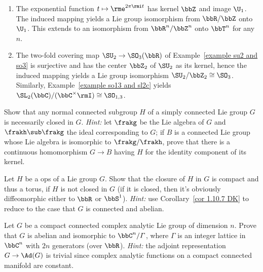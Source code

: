 \begin{example}
    \begin{enumerate}
        \item The exponential function $t\mapsto \rme^{2\pi\rmi t}$ has kernel $\bbZ$ and image $\U_1$. The induced mapping yields a Lie group isomorphism from $\bbR\slash \bbZ$ onto $\U_1$. This extends to an isomorphism from $\bbR^n\slash\bbZ^n$ onto $\bbT^n$ for any $n$.
        \item The two-fold covering map $\SU_2\to \SO_3(\bbR)$ of Example~\ref{example su2 and so3} is surjective and has the center $\bbZ_2$ of $\SU_2$ as its kernel, hence the induced mapping yields a Lie group isomorphism $\SU_2\slash\bbZ_2\cong \SO_3$. Similarly, Example~\ref{example so13 and sl2c} yields $\SL_2(\bbC)\slash (\bbC^\times \rmI)\cong \SO_{1,3}$.
    \end{enumerate}
\end{example}



\begin{xca}
    Show that any normal connected subgroup $H$ of a simply connected Lie group $G$ is necessarily closed in $G$. \emph{Hint:} let $\frakg$ be the Lie algebra of $G$ and $\frakh\sub\frakg$ the ideal corresponding to $G$; if $B$ is a connected Lie group whose Lie algebra is isomorphic to $\frakg\slash\frakh$, prove that there is a continuous homomorphism $G\to B$ having $H$ for the identity component of its kernel.
\end{xca}

\begin{xca}
    Let $H$ be a \gls{ops} of a Lie group $G$. Show that the closure of $H$ in $G$ is compact and thus a torus, if $H$ is not closed in $G$ (if it is closed, then it's obviously diffeomorphic either to $\bbR$ or $\bbS^1$). \emph{Hint:} use Corollary~\ref{cor 1.10.7 DK} to reduce to the case that $G$ is connected and abelian.
\end{xca}

\begin{xca}
    Let $G$ be a compact connected complex analytic Lie group of dimension $n$. Prove that $G$ is abelian and isomorphic to $\bbC^n\slash\varGamma$, where $\varGamma$ is an integer lattice in $\bbC^n$ with $2n$ generators (over $\bbR$). \emph{Hint:} the adjoint representation $G\to \Ad(G)$ is trivial since complex analytic functions on a compact connected manifold are constant.
\end{xca}









